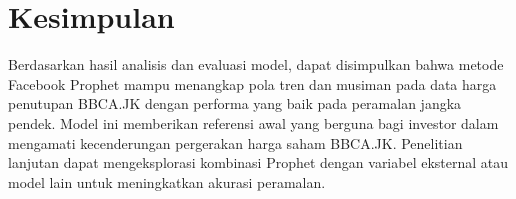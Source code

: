 \documentclass[11pt,twoside]{article}
\begin{document}
\section{Kesimpulan}
\label{Sec:Conclusion}
Berdasarkan hasil analisis dan evaluasi model, dapat disimpulkan bahwa metode Facebook Prophet mampu menangkap pola tren dan musiman pada data harga penutupan BBCA.JK dengan performa yang baik pada peramalan jangka pendek. Model ini memberikan referensi awal yang berguna bagi investor dalam mengamati kecenderungan pergerakan harga saham BBCA.JK. Penelitian lanjutan dapat mengeksplorasi kombinasi Prophet dengan variabel eksternal atau model lain untuk meningkatkan akurasi peramalan.

\printbibliography
\end{document}
